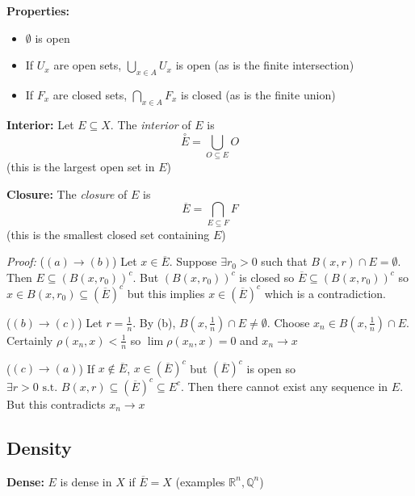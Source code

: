 \documentclass[12pt]{article}
\newcommand{\R}{\mathbb{R}}
\newcommand{\Q}{\mathbb{Q}}
\newcommand{\sub}{\subseteq}
\newcommand{\st}{\text{ s.t. }}
\renewcommand{\bar}[1]{\overline{#1}}
\newenvironment*{tbox}[2][gray]{
    \begin{tcolorbox}[
        parbox=false,
        colback=#1!5!white,
        colframe=#1!75!black,
        breakable,
        title={#2}
    ]}
    {\end{tcolorbox}}
\begin{document}
    \textbf{Properties:}
    \begin{itemize}
        \item $\emptyset$ is open 
        \item If $U_x$ are open sets, $\bigcup_{x \in A} U_x$ is open (as is the finite intersection)
        \item If $F_x$ are closed sets, $\bigcap_{x \in A} F_x$ is closed (as is the finite union)
    \end{itemize}

    \textbf{Interior:} Let $E \sub X$. The \emph{interior} of $E$ is 
    \[\overset{\circ}{E} = \bigcup_{O \sub E} O\]
    (this is the largest open set in $E$)

    \textbf{Closure:} The \emph{closure} of $E$ is
    \[\bar E = \bigcap_{E \sub F} F\]
    (this is the smallest closed set containing $E$)
    
    \begin{tbox}{\textbf{Proposition:} Let $(X, \rho)$ be a metric space. Let $E \sub X$ and $x \in X$. Then the following are equivalent:
        \begin{enumerate}[label=(\alph*)]
            \item $x \in \bar E$
            \item $B(x, r) \cap E \neq \emptyset$ for all $r > 0$
            \item $\exists (x_n) \sub E$ such that $x_n \to x$
        \end{enumerate}}
        \emph{Proof:} 
        ($(a) \to (b)$) Let $x \in \bar E$. Suppose $\exists r_0 >0$ such that $B(x, r) \cap E = \emptyset$. Then $E \sub (B(x, r_0))^c$. But $(B(x, r_0))^c$ is closed so $\bar E \sub (B(x, r_0))^c$ so $x \in B(x, r_0) \sub (\bar E)^c$ but this implies $x \in (\bar E)^c$ which is a contradiction. 

        ($(b) \to (c)$) Let $r = \frac{1}{n}$. By (b), $B(x, \frac{1}{n}) \cap E \neq \emptyset$. Choose $x_n \in B(x, \frac{1}{n}) \cap E$. Certainly $\rho(x_n, x) < \frac{1}{n}$ so $\lim \rho(x_n, x) = 0$ and $x_n \to x$

        ($(c) \to (a)$) If $x \notin \bar E$, $x \in (\bar E)^c$ but $(\bar E)^c$ is open so $\exists r > 0 \st B(x, r) \sub (\bar E)^c \sub E^c$. Then there cannot exist any sequence in $E$. But this contradicts $x_n \to x$
    \end{tbox}

\subsection*{Density}
    \textbf{Dense:} $E$ is dense in $X$ if $\bar E = X$ (examples $\R^n, \Q^n$)
\end{document}

